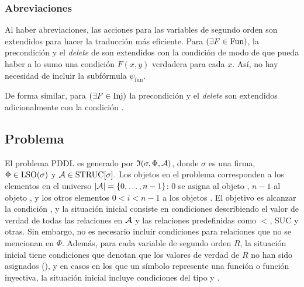 
\subsubsection{Abreviaciones}
Al haber abreviaciones, las acciones para las variables de segundo orden son
extendidos para hacer la traducción más eficiente. Para $(\exists F\in\text{Fun})$,
la precondición y el \textit{delete} de  son
extendidos con la condición  de modo de que pueda
haber a lo sumo una condición $F(x,y)$ verdadera para cada $x$. Así, no hay
necesidad de incluir la subfórmula $\psi_\text{fun}$. 

De forma similar, para $(\exists F\in\text{Inj})$ la precondición y el
\textit{delete}
son extendidos adicionalmente con la condición .

\subsection{Problema}

\label{traduccionproblema}
El problema PDDL es generado por $\mathfrak{I}(\sigma,\Phi,\mathcal{A})$, donde
$\sigma$ es una firma, $\Phi\in\text{LSO}(\sigma)$ y $\mathcal{A}\in\text{STRUC}[\sigma]$.
Los objetos en el problema corresponden a los elementos en el universo
$|\mathcal{A}|=\{0,\ldots,n-1\}$: $0$ se asigna al objeto
, $n-1$ al objeto , y los otros elementos
$0<i<n-1$ a los objetos .
El objetivo es alcanzar la condición , y la situación
inicial consiste en condiciones describiendo el valor de verdad de todas las
relaciones en $\mathcal{A}$ y las relaciones predefinidas como $<$, SUC y otras. Sin
embargo, no es necesario incluir condiciones para relaciones que no se
mencionan en $\Phi$. Además, para cada variable de segundo orden $R$, la
situación inicial tiene condiciones que denotan que los valores de verdad de
$R$ no han sido asignados (), y en casos en los que un símbolo
represente una función o función inyectiva, la situación inicial incluye
condiciones del tipo  y .


